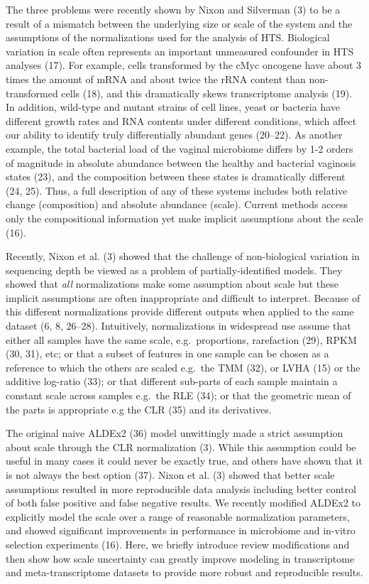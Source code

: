 \documentclass[
]{article}
\begin{document}
The three problems were recently shown by Nixon and Silverman (3) to be
a result of a mismatch between the underlying size or scale of the
system and the assumptions of the normalizations used for the analysis
of HTS. Biological variation in scale often represents an important
unmeasured confounder in HTS analyses (17). For example, cells
transformed by the cMyc oncogene have about 3 times the amount of mRNA
and about twice the rRNA content than non-transformed cells (18), and
this dramatically skews transcriptome analysis (19). In addition,
wild-type and mutant strains of cell lines, yeast or bacteria have
different growth rates and RNA contents under different conditions,
which affect our ability to identify truly differentially abundant genes
(20--22). As another example, the total bacterial load of the vaginal
microbiome differs by 1-2 orders of magnitude in absolute abundance
between the healthy and bacterial vaginosis states (23), and the
composition between these states is dramatically different (24, 25).
Thus, a full description of any of these systems includes both relative
change (composition) and absolute abundance (scale). Current methods
access only the compositional information yet make implicit assumptions
about the scale (16).

Recently, Nixon et al. (3) showed that the challenge of non-biological
variation in sequencing depth be viewed as a problem of
partially-identified models. They showed that \emph{all} normalizations
make some assumption about scale but these implicit assumptions are
often inappropriate and difficult to interpret. Because of this
different normalizations provide different outputs when applied to the
same dataset (6, 8, 26--28). Intuitively, normalizations in widespread
use assume that either all samples have the same scale,
e.g.~proportions, rarefaction (29), RPKM (30, 31), etc; or that a subset
of features in one sample can be chosen as a reference to which the
others are scaled e.g.~the TMM (32), or LVHA (15) or the additive
log-ratio (33); or that different sub-parts of each sample maintain a
constant scale across samples e.g.~the RLE (34); or that the geometric
mean of the parts is appropriate e.g the CLR (35) and its derivatives.

The original naive ALDEx2 (36) model unwittingly made a strict
assumption about scale through the CLR normalization (3). While this
assumption could be useful in many cases it could never be exactly true,
and others have shown that it is not always the best option (37). Nixon
et al. (3) showed that better scale assumptions resulted in more
reproducible data analysis including better control of both false
positive and false negative results. We recently modified ALDEx2 to
explicitly model the scale over a range of reasonable normalization
parameters, and showed significant improvements in performance in
microbiome and in-vitro selection experiments (16). Here, we briefly
introduce review modifications and then show how scale uncertainty can
greatly improve modeling in transcriptome and meta-transcriptome
datasets to provide more robust and reproducible results.
\end{document}
